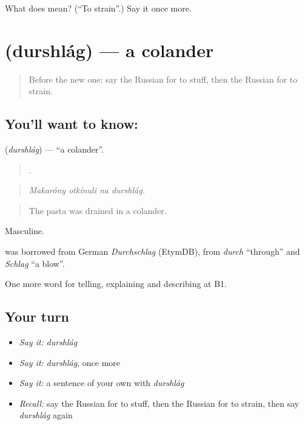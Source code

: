 \begin{tcolorbox}[breakable,colback=teal!4,colframe=teal!35!black,title={Before you move on}]
What does  mean? (\textquotedblleft{}To strain\textquotedblright{}.) Say it once more.
\end{tcolorbox}
\section[\texorpdfstring{\ru{дуршлаг} (durshlág)}{дуршлаг (durshlág)}]{ (durshlág) — a colander}

\label{lesson:RU-C334-durshlag}



\begin{quote}
Before the new one: say the Russian for to stuff, then the Russian for to strain.
\end{quote}

\subsection*{You'll want to know: }
\textbf{} (\emph{durshlág}) — \textquotedblleft{}a colander\textquotedblright{}.

\begin{quote}
   .
\end{quote}

\begin{quote}
\emph{Makaróny otkínuli na durshlág.}
\end{quote}

\begin{quote}
The pasta was drained in a colander.
\end{quote}

Masculine.

\begin{cousinweb}
\emph{} was borrowed from German \emph{Durchschlag} (EtymDB), from \emph{durch} \textquotedblleft{}through\textquotedblright{} and \emph{Schlag} \textquotedblleft{}a blow\textquotedblright{}.
\end{cousinweb}

\begin{grammarlens}[title={What you've built}]
One more word for telling, explaining and describing at B1.
\end{grammarlens}

\subsection*{Your turn}
\begin{itemize}
\raggedright
  \item \emph{Say it:} \emph{durshlág}
  \item \emph{Say it:} \emph{durshlág}, once more
  \item \emph{Say it:} a sentence of your own with \emph{durshlág}
  \item \emph{Recall:} say the Russian for to stuff, then the Russian for to strain, then say \emph{durshlág} again
\end{itemize}

